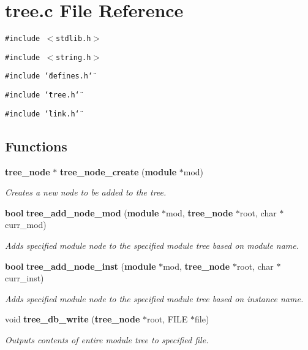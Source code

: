 \section{tree.c File Reference}
\label{tree_8c}
{\tt \#include $<$stdlib.h$>$}\par
{\tt \#include $<$string.h$>$}\par
{\tt \#include \char`\"{}defines.h\char`\"{}}\par
{\tt \#include \char`\"{}tree.h\char`\"{}}\par
{\tt \#include \char`\"{}link.h\char`\"{}}\par
\subsection*{Functions}
\begin{CompactItemize}
\item 
{\bf tree\_\-node} $\ast$ {\bf tree\_\-node\_\-create} ({\bf module} $\ast$mod)
\begin{CompactList}\small\item\em Creates a new node to be added to the tree.\item\end{CompactList}\item 
{\bf bool} {\bf tree\_\-add\_\-node\_\-mod} ({\bf module} $\ast$mod, {\bf tree\_\-node} $\ast$root, char $\ast$curr\_\-mod)
\begin{CompactList}\small\item\em Adds specified module node to the specified module tree based on module name.\item\end{CompactList}\item 
{\bf bool} {\bf tree\_\-add\_\-node\_\-inst} ({\bf module} $\ast$mod, {\bf tree\_\-node} $\ast$root, char $\ast$curr\_\-inst)
\begin{CompactList}\small\item\em Adds specified module node to the specified module tree based on instance name.\item\end{CompactList}\item 
void {\bf tree\_\-db\_\-write} ({\bf tree\_\-node} $\ast$root, FILE $\ast$file)
\begin{CompactList}\small\item\em Outputs contents of entire module tree to specified file.\item\end{CompactList}\item 

\end{CompactItemize}
